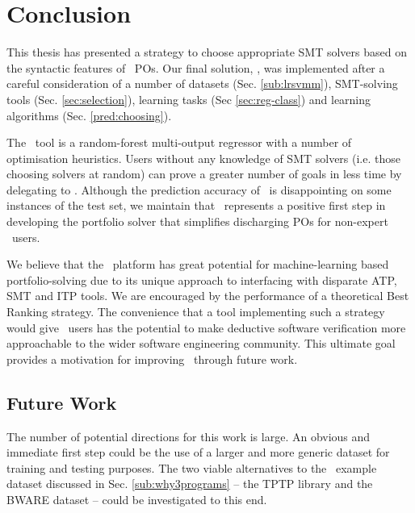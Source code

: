 \chapter{Conclusion}
\thispagestyle{nohead}
\label{Conclusion}

This thesis has presented a strategy to choose appropriate SMT solvers based on the syntactic features of \why~POs.
Our final solution, \where, was implemented after a careful consideration of a number of datasets (Sec. \ref{sub:lrsvmm}), SMT-solving tools (Sec. \ref{sec:selection}), learning tasks (Sec \ref{sec:reg-class}) and learning algorithms (Sec. \ref{pred:choosing}).

The \where~tool is a random-forest multi-output regressor with a number of optimisation heuristics.
Users without any knowledge of SMT solvers (i.e. those choosing solvers at random) can prove a greater number of goals in less time by delegating to \where. 
Although the prediction accuracy of \where~is disappointing on some instances of the test set, we maintain that \where~represents a positive first step in developing the portfolio solver that simplifies
 discharging POs for non-expert \why~users.


We believe that the \why~platform has great potential for machine-learning based portfolio-solving due to its unique approach to interfacing with disparate ATP, SMT and ITP tools.
We are encouraged by the performance of a theoretical \textsf{Best Ranking} strategy.
The convenience that a tool implementing such a strategy would give \why~users has the potential to make deductive software verification more approachable to the wider software engineering community.
This ultimate goal provides a motivation for improving \where~through future work.

\section{Future Work}
\label{sec:future}

The number of potential directions for this work is large.
An obvious and immediate first step could be the use of a larger and more generic dataset for training and testing purposes.
The two viable alternatives to the \why~example dataset discussed in Sec. \ref{sub:why3programs} -- the TPTP library \cite{TPTP} and the BWARE dataset \cite{Delahaye2014} -- could be investigated to this end.
 
